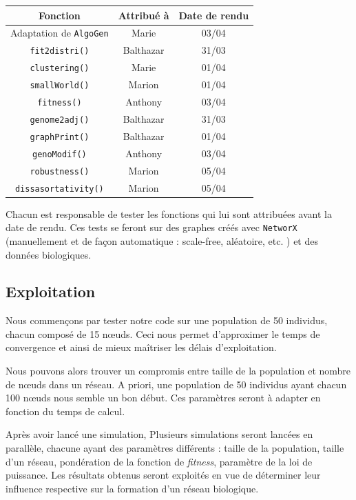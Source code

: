 \begin{center}
\begin{table}[!h]
\begin{tabular}{|c|c|c|}
\hline \textbf{Fonction} & \textbf{Attribué à} & \textbf{Date de rendu} \\
\hline
Adaptation de \verb?AlgoGen? & Marie & 03/04 \\
\hline
\verb?fit2distri()? & Balthazar & 31/03 \\
\hline
\verb?clustering()? & Marie & 01/04\\
\hline 
\verb?smallWorld()? & Marion & 01/04\\
\hline
\verb?fitness()? & Anthony & 03/04\\
\hline 
\verb?genome2adj()? & Balthazar & 31/03 \\
\hline 
\verb?graphPrint()? & Balthazar & 01/04 \\
\hline 
\verb?genoModif()? & Anthony & 03/04 \\
\hline 
\verb?robustness()? & Marion & 05/04 \\
\hline 
\verb?dissasortativity()? & Marion & 05/04\\
\hline 
\end{tabular}
\end{table}
\end{center}

Chacun est responsable de tester les fonctions qui lui sont attribuées avant la date de rendu. Ces tests se feront sur des graphes créés avec \verb?NetworX? (manuellement et de façon automatique : scale-free, aléatoire, etc. ) et des données biologiques.

\subsection{Exploitation}

Nous commençons par tester notre code sur une population de 50 individus, chacun composé de 15 nœuds. Ceci nous permet d'approximer le temps de convergence et ainsi de mieux ma\^itriser les délais d'exploitation.

Nous pouvons alors trouver un compromis entre taille de la population et nombre de nœuds dans un réseau. A priori, une population de 50 individus ayant chacun 100 nœuds nous semble un bon début. Ces paramètres seront à adapter en fonction du temps de calcul.

Après avoir lancé une simulation, Plusieurs simulations seront lancées en parallèle, chacune ayant des paramètres différents : taille de la population, taille d'un réseau, pondération de la fonction de \textit{fitness}, paramètre de la loi de puissance. Les résultats obtenus seront exploités en vue de déterminer leur influence respective sur la formation d'un réseau biologique.


